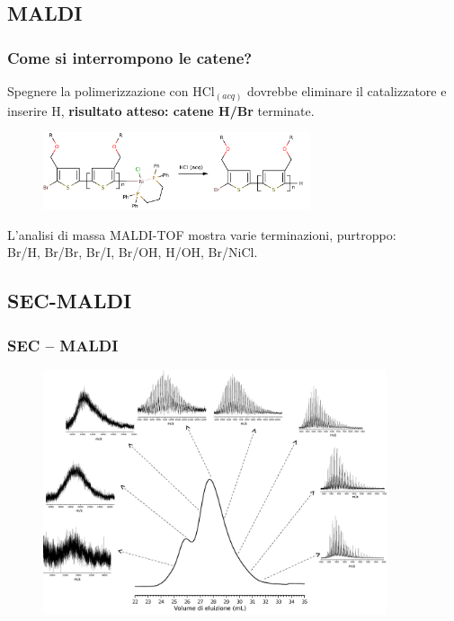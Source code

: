 \documentclass{beamer}
\begin{document}
\subsection{MALDI}
\begin{frame}%
\frametitle{Come si interrompono le catene?}

Spegnere la polimerizzazione con HCl$_{(acq)}$ dovrebbe eliminare il catalizzatore e inserire H, \textbf{risultato atteso: catene H/Br} terminate.
\vfill

\begin{figure}\centering 
\includegraphics[width=0.7\textwidth]{img/syn-quenching.pdf}
\end{figure}

\vfill
\pause
L'analisi di massa MALDI-TOF mostra varie terminazioni, purtroppo: \\ Br/H, Br/Br, Br/I, Br/OH, H/OH, Br/NiCl.
\end{frame}
\subsection{SEC-MALDI}
\begin{frame}%
\frametitle{SEC -- MALDI}
\begin{figure}
  \includegraphics[width=0.9\textwidth]{img/ig2-8-sec-maldi2.png}
\end{figure}
\end{frame}
\end{document}
